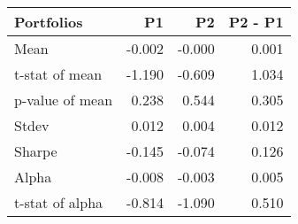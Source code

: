 \begin{tabular}{lrrr}
\toprule
Portfolios & P1 & P2 & P2 - P1 \\
\midrule
Mean & -0.002 & -0.000 & 0.001 \\
t-stat of mean & -1.190 & -0.609 & 1.034 \\
p-value of mean & 0.238 & 0.544 & 0.305 \\
Stdev & 0.012 & 0.004 & 0.012 \\
Sharpe & -0.145 & -0.074 & 0.126 \\
Alpha & -0.008 & -0.003 & 0.005 \\
t-stat of alpha & -0.814 & -1.090 & 0.510 \\
\bottomrule
\end{tabular}
